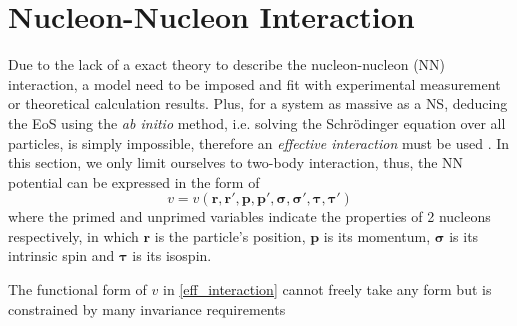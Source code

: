 \section{Nucleon-Nucleon Interaction}%
\label{sec:nucleon_nucleon_interaction}

Due to the lack of a exact theory to describe the nucleon-nucleon (\gls{NN}) interaction, a model need to be imposed and fit with experimental measurement or theoretical calculation results. Plus, for a system as massive as a \gls{NS}, deducing the \gls{EoS} using the \emph{ab initio} method, i.e. solving the Schr\"{o}dinger equation over all particles, is simply impossible, therefore an \emph{effective interaction} must be used \citep{greiner1996nuclear}. In this section, we only limit ourselves to two-body interaction, thus, the \gls{NN} potential can be expressed in the form of
\begin{equation}
        v = v(\bm{r}, \bm{r'}, \bm{p}, \bm{p'}, \bm{\sigma}, \bm{\sigma'}, \bm{\tau}, \bm{\tau'})
        \label{eff_interaction}
\end{equation}
where the primed and unprimed variables indicate the properties of 2 nucleons respectively, in which $\bm{r}$ is the particle's position, $\bm{p}$ is its momentum, $\bm{\sigma}$ is its intrinsic spin and $\bm{\tau}$ is its isospin.\par
The functional form of $v$ in \eqref{eff_interaction} cannot freely take any form but is constrained by many invariance requirements \citep{greiner1996nuclear}
